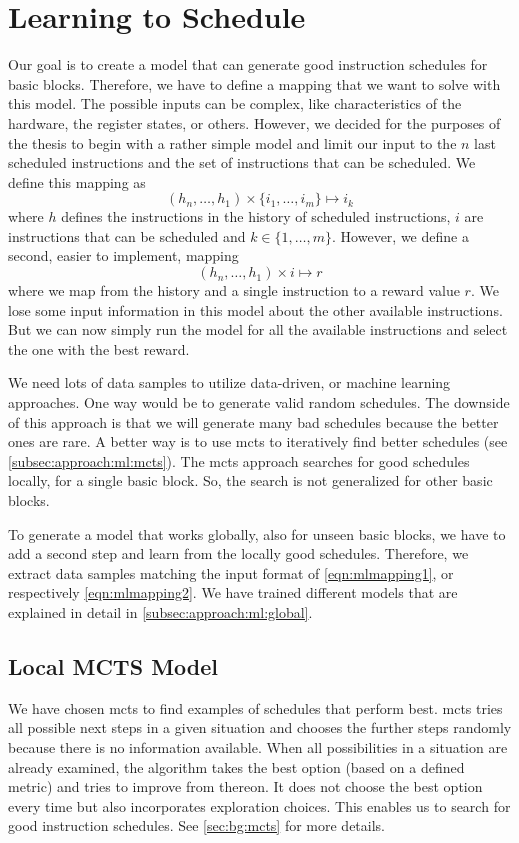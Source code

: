 \section{Learning to Schedule}
\label{sec:approach:ml}
Our goal is to create a model that can generate good instruction schedules for basic blocks.
Therefore, we have to define a mapping that we want to solve with this model.
The possible inputs can be complex, like characteristics of the hardware, the register states, or others.
However, we decided for the purposes of the thesis to begin with a rather simple model and limit our input to the $n$ last scheduled instructions and the set of instructions that can be scheduled.
We define this mapping as
\begin{equation}
    (h_n, \ldots, h_1) \times \{i_1, \ldots, i_m\} \mapsto i_k
    \label{eqn:mlmapping1}
\end{equation}
where $h$ defines the instructions in the history of scheduled instructions, $i$ are instructions that can be scheduled and $k \in \{1, \ldots, m\}$.
However, we define a second, easier to implement, mapping
\begin{equation}
    (h_n, \ldots, h_1) \times i \mapsto r
    \label{eqn:mlmapping2}
\end{equation}
where we map from the history and a single instruction to a reward value $r$.
We lose some input information in this model about the other available instructions.
But we can now simply run the model for all the available instructions and select the one with the best reward.

We need lots of data samples to utilize data-driven, or machine learning approaches.
One way would be to generate valid random schedules.
The downside of this approach is that we will generate many bad schedules because the better ones are rare.
A better way is to use \ac{mcts} to iteratively find better schedules (see \cref{subsec:approach:ml:mcts}).
The \ac{mcts} approach searches for good schedules locally, \ie for a single basic block.
So, the search is not generalized for other basic blocks.

To generate a model that works globally, \ie also for unseen basic blocks, we have to add a second step and learn from the locally good schedules.
Therefore, we extract data samples matching the input format of \cref{eqn:mlmapping1}, or respectively \cref{eqn:mlmapping2}.
We have trained different models that are explained in detail in \cref{subsec:approach:ml:global}.

\subsection{Local MCTS Model}
\label{subsec:bg:ml:mcts}
We have chosen \ac{mcts} to find examples of schedules that perform best.
\ac{mcts} tries all possible next steps in a given situation and chooses the further steps randomly because there is no information available.
When all possibilities in a situation are already examined, the algorithm takes the best option (based on a defined metric) and tries to improve from thereon.
It does not choose the best option every time but also incorporates exploration choices.
This enables us to search for good instruction schedules.
See \cref{sec:bg:mcts} for more details.

